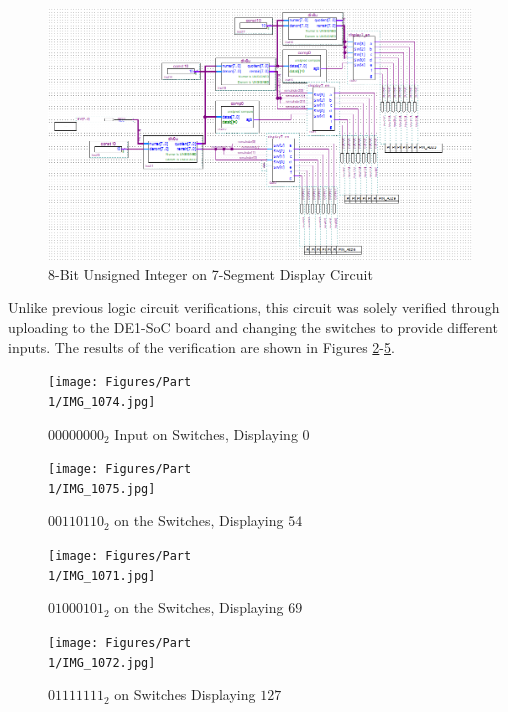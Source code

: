 \documentclass[
	letterpaper, %
	10pt, %
]{CSUniSchoolLabReport}
\begin{document}
\begin{figure}[H]
  \centering
  \includegraphics[width=.9\textwidth]{Figures/8BDesign.png}
  \caption{8-Bit Unsigned Integer on 7-Segment Display Circuit}
  \label{fig:1}
\end{figure}

\hspace{.5 in} Unlike previous logic circuit verifications, this circuit was solely verified through uploading to the DE1-SoC board and changing the switches to provide different inputs. The results of the verification are shown in Figures \ref{fig:2}-\ref{fig:5}.

\begin{figure}[H]
  \centering
  \texttt{[image: Figures/Part\\ 1/IMG\_1074.jpg]}
  \caption{$00000000_2$ Input on Switches, Displaying $0$}
  \label{fig:2}
\end{figure}

\begin{figure}[H]
  \centering
  \texttt{[image: Figures/Part\\ 1/IMG\_1075.jpg]}
  \caption{$00110110_2$ on the Switches, Displaying $54$}
  \label{fig:3}
\end{figure}

\begin{figure}[H]
  \centering
  \texttt{[image: Figures/Part\\ 1/IMG\_1071.jpg]}
  \caption{$01000101_2$ on the Switches, Displaying $69$}
  \label{fig:4}
\end{figure}

\begin{figure}[H]
  \centering
  \texttt{[image: Figures/Part\\ 1/IMG\_1072.jpg]}
  \caption{$01111111_2$ on Switches Displaying $127$}
  \label{fig:5}
\end{figure}
\end{document}
